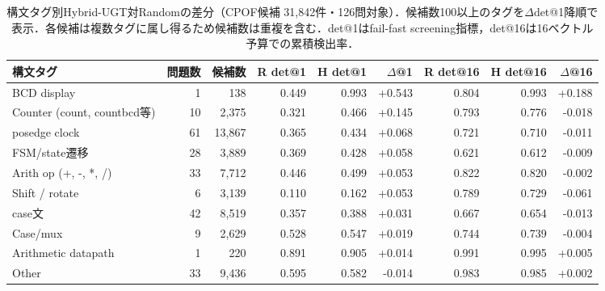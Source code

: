 \begin{table}[t]
\caption{構文タグ別Hybrid-UGT対Randomの差分（CPOF候補 31,842件・126問対象）．候補数100以上のタグを$\Delta$det@1降順で表示．各候補は複数タグに属し得るため候補数は重複を含む．det@1はfail-fast screening指標，det@16は16ベクトル予算での累積検出率．}
\label{tab:ugt_struct_full}
\centering
\footnotesize
\setlength{\tabcolsep}{4pt}
\begin{tabular}{@{}lrrrrrrrr@{}}
\hline
構文タグ & 問題数 & 候補数 & R det@1 & H det@1 & $\Delta$@1 & R det@16 & H det@16 & $\Delta$@16 \\
\hline
BCD display & 1 & 138 & 0.449 & 0.993 & +0.543 & 0.804 & 0.993 & +0.188 \\
Counter (count, countbcd等) & 10 & 2,375 & 0.321 & 0.466 & +0.145 & 0.793 & 0.776 & -0.018 \\
posedge clock & 61 & 13,867 & 0.365 & 0.434 & +0.068 & 0.721 & 0.710 & -0.011 \\
FSM/state遷移 & 28 & 3,889 & 0.369 & 0.428 & +0.058 & 0.621 & 0.612 & -0.009 \\
Arith op (+, -, *, /) & 33 & 7,712 & 0.446 & 0.499 & +0.053 & 0.822 & 0.820 & -0.002 \\
Shift / rotate & 6 & 3,139 & 0.110 & 0.162 & +0.053 & 0.789 & 0.729 & -0.061 \\
case文 & 42 & 8,519 & 0.357 & 0.388 & +0.031 & 0.667 & 0.654 & -0.013 \\
Case/mux & 9 & 2,629 & 0.528 & 0.547 & +0.019 & 0.744 & 0.739 & -0.004 \\
Arithmetic datapath & 1 & 220 & 0.891 & 0.905 & +0.014 & 0.991 & 0.995 & +0.005 \\
Other & 33 & 9,436 & 0.595 & 0.582 & -0.014 & 0.983 & 0.985 & +0.002 \\
\hline
\end{tabular}
\end{table}
